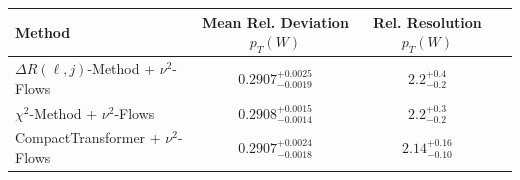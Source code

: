     \begin{tabular}{lccc}
        \toprule
        Method & Mean Rel. Deviation $p_{T}(W)$ & Rel. Resolution $p_{T}(W)$ \\
        \midrule
        $\Delta R(\ell,j)$-Method + $\nu^2$-Flows & $0.2907^{+0.0025}_{-0.0019}$ & $2.2^{+0.4}_{-0.2}$ \\
        $\chi^2$-Method + $\nu^2$-Flows & $0.2908^{+0.0015}_{-0.0014}$ & $2.2^{+0.3}_{-0.2}$ \\
        CompactTransformer + $\nu^2$-Flows & $0.2907^{+0.0024}_{-0.0018}$ & $2.14^{+0.16}_{-0.10}$ \\
        \bottomrule
    \end{tabular}